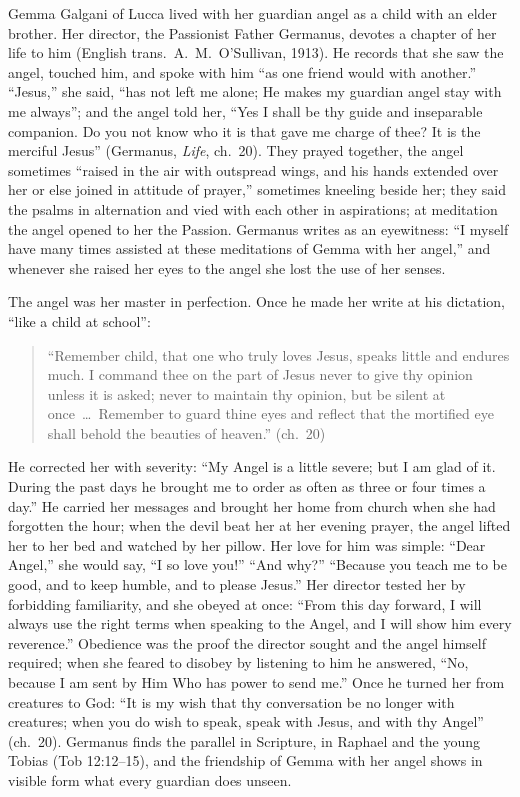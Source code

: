 Gemma Galgani of Lucca lived with her guardian angel as a child with an
elder brother. Her director, the Passionist Father Germanus, devotes a chapter of her
life to him (English trans.\ A.\ M.\ O'Sullivan, 1913). He records that she saw the angel, touched him, and
spoke with him ``as one friend would with another.'' ``Jesus,'' she said,
``has not left me alone; He makes my guardian angel stay with me always'';
and the angel told her, ``Yes I shall be thy guide and inseparable
companion. Do you not know who it is that gave me charge of thee? It is the
merciful Jesus'' (Germanus, \emph{Life}, ch.~20). They prayed together, the
angel sometimes ``raised in the air with outspread wings, and his hands
extended over her or else joined in attitude of prayer,'' sometimes kneeling
beside her; they said the psalms in alternation and vied with each other in
aspirations; at meditation the angel opened to her the Passion. Germanus writes
as an eyewitness: ``I myself have many times assisted at these meditations of
Gemma with her angel,'' and whenever she raised her eyes to the angel she
lost the use of her senses.

The angel was her master in perfection. Once he made her write at his
dictation, ``like a child at school'':
\begin{quote}
``Remember child, that one who truly loves Jesus, speaks little and endures
much. I command thee on the part of Jesus never to give thy opinion unless
it is asked; never to maintain thy opinion, but be silent at once~\dots\
Remember to guard thine eyes and reflect that the mortified eye shall behold
the beauties of heaven.'' (ch.~20)
\end{quote}
He corrected her with severity: ``My Angel is a little severe; but I am glad
of it. During the past days he brought me to order as often as three or four
times a day.'' He carried her messages and brought her home from church when
she had forgotten the hour; when the devil beat her at her evening prayer,
the angel lifted her to her bed and watched by her pillow. Her love for him
was simple: ``Dear Angel,'' she would say, ``I so love you!'' ``And why?''
``Because you teach me to be good, and to keep humble, and to please
Jesus.'' Her director tested her by forbidding familiarity, and she obeyed
at once: ``From this day forward, I will always use the right terms when
speaking to the Angel, and I will show him every reverence.'' Obedience was
the proof the director sought and the angel himself required; when she
feared to disobey by listening to him he answered, ``No, because I am sent by
Him Who has power to send me.'' Once he turned her from creatures to God: ``It is my wish that thy conversation be no longer with creatures; when
you do wish to speak, speak with Jesus, and with thy Angel'' (ch.~20).
Germanus finds the parallel in Scripture, in Raphael and the young Tobias
(Tob 12:12--15), and the friendship of Gemma with her angel shows in visible
form what every guardian does unseen.

